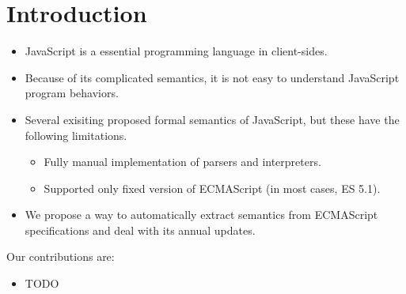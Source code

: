 \section{Introduction}

\begin{itemize}
  \item JavaScript is a essential programming language in client-sides.
  \item Because of its complicated semantics, it is not easy to understand JavaScript program behaviors.
  \item Several exisiting proposed formal semantics of JavaScript, but these have the following limitations.
    \begin{itemize}
      \item Fully manual implementation of parsers and interpreters.
      \item Supported only fixed version of ECMAScript (in most cases, ES 5.1).
    \end{itemize}
  \item We propose a way to automatically extract semantics from ECMAScript specifications and deal with its annual updates.
\end{itemize}

Our contributions are:
\begin{itemize}
  \item TODO
\end{itemize}
